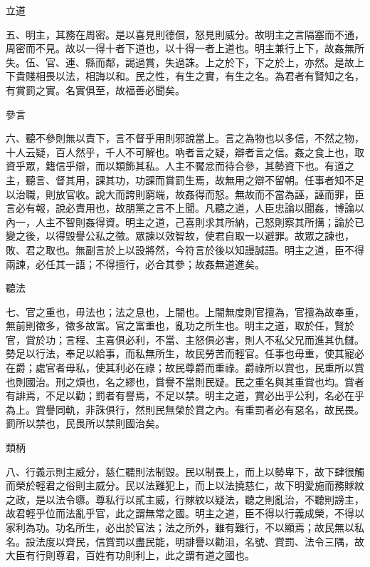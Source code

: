 \begin{pinyinscope}
立道

五、明主，其務在周密。是以喜見則德償，怒見則威分。故明主之言隔塞而不通，周密而不見。故以一得十者下道也，以十得一者上道也。明主兼行上下，故姦無所失。伍、官、連、縣而鄰，謁過賞，失過誅。上之於下，下之於上，亦然。是故上下貴賤相畏以法，相誨以和。民之性，有生之實，有生之名。為君者有賢知之名，有賞罰之實。名實俱至，故福善必聞矣。

參言

六、聽不參則無以責下，言不督乎用則邪說當上。言之為物也以多信，不然之物，十人云疑，百人然乎，千人不可解也。吶者言之疑，辯者言之信。姦之食上也，取資乎眾，籍信乎辯，而以類飾其私。人主不饜忿而待合參，其勢資下也。有道之主，聽言、督其用，課其功，功課而賞罰生焉，故無用之辯不留朝。任事者知不足以治職，則放官收。說大而誇則窮端，故姦得而怒。無故而不當為誣，誣而罪，臣言必有報，說必責用也，故朋黨之言不上聞。凡聽之道，人臣忠論以聞姦，博論以內一，人主不智則姦得資。明主之道，己喜則求其所納，己怒則察其所搆；論於已變之後，以得毀譽公私之徵。眾諫以效智故，使君自取一以避罪。故眾之諫也，敗、君之取也。無副言於上以設將然，今符言於後以知謾誠語。明主之道，臣不得兩諫，必任其一語；不得擅行，必合其參；故姦無道進矣。

聽法

七、官之重也，毋法也；法之息也，上闇也。上闇無度則官擅為，官擅為故奉重，無前則徵多，徵多故富。官之富重也，亂功之所生也。明主之道，取於任，賢於官，賞於功；言程、主喜俱必利，不當、主怒俱必害，則人不私父兄而進其仇讎。勢足以行法，奉足以給事，而私無所生，故民勞苦而輕官。任事也毋重，使其寵必在爵；處官者毋私，使其利必在祿；故民尊爵而重祿。爵祿所以賞也，民重所以賞也則國治。刑之煩也，名之繆也，賞譽不當則民疑。民之重名與其重賞也均。賞者有誹焉，不足以勸；罰者有譽焉，不足以禁。明主之道，賞必出乎公利，名必在乎為上。賞譽同軌，非誅俱行，然則民無榮於賞之內。有重罰者必有惡名，故民畏。罰所以禁也，民畏所以禁則國治矣。

類柄

八、行義示則主威分，慈仁聽則法制毀。民以制畏上，而上以勢卑下，故下肆很觸而榮於輕君之俗則主威分。民以法難犯上，而上以法撓慈仁，故下明愛施而務賕紋之政，是以法令隳。尊私行以貳主威，行賕紋以疑法，聽之則亂治，不聽則謗主，故君輕乎位而法亂乎官，此之謂無常之國。明主之道，臣不得以行義成榮，不得以家利為功。功名所生，必出於官法；法之所外，雖有難行，不以顯焉；故民無以私名。設法度以齊民，信賞罰以盡民能，明誹譽以勸沮，名號、賞罰、法令三隅，故大臣有行則尊君，百姓有功則利上，此之謂有道之國也。


\end{pinyinscope}